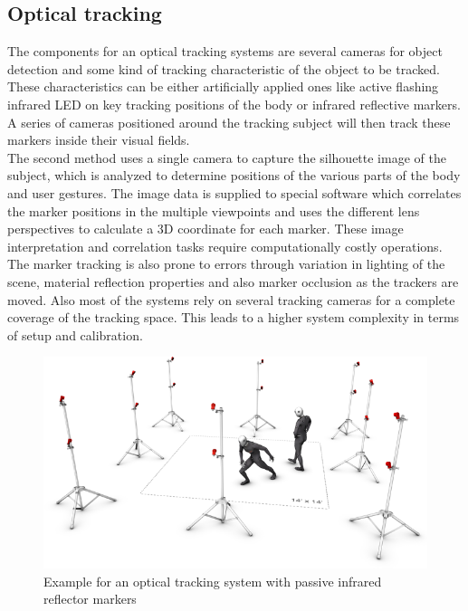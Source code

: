 \subsection{Optical tracking}
The components for an optical tracking systems are several cameras for object detection and some kind of tracking characteristic of the object to be tracked. These characteristics can be either artificially applied ones like active flashing infrared LED on key tracking positions of the body or infrared reflective markers. A series of cameras positioned around the tracking subject will then track these markers inside their visual fields. \\The second method uses a single camera to capture the silhouette image of the subject, which is analyzed to determine positions of the various parts of the body and user gestures.
The image data is supplied to special software which correlates the marker positions in the multiple viewpoints and uses the different lens perspectives to calculate a 3D coordinate for each marker. These image interpretation and correlation tasks require computationally costly operations. The marker tracking is also prone to errors through variation in lighting of the scene, material reflection properties and also marker occlusion as the trackers are moved. Also most of the systems rely on several tracking cameras for a complete coverage of the tracking space. This leads to a higher system complexity in terms of setup and calibration.
\begin{figure}[H]
\label{optic reflector tracking}
\includegraphics[scale=0.6]{images/flex13MocapVolume.png} 
\caption{Example for an optical tracking system with passive infrared reflector markers \cite{optitrack.2017}}
\end{figure}
